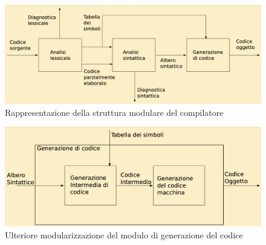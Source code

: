 \begin{figure}
    \centering
    \includegraphics[width=1\linewidth]{assets/compilatore.png}
    \caption{Rappresentazione della struttura modulare del compilatore}
\end{figure}

\begin{figure}
    \centering
    \includegraphics[width=1\linewidth]{assets/gencod.png}
    \caption{Ulteriore modularizzazione del modulo di generazione del codice}
\end{figure}

\newpage